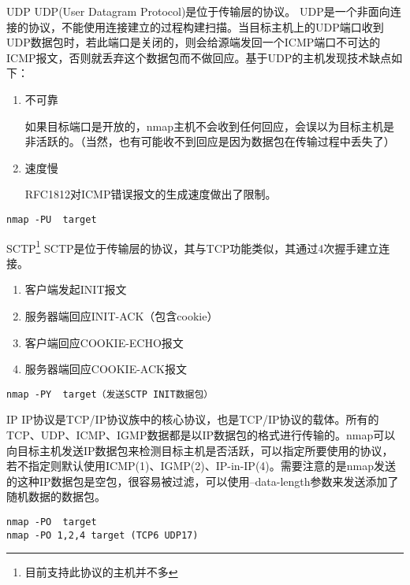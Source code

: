\documentclass{beamer}
\begin{document}
\begin{frame}[fragile]{UDP}
UDP(User Datagram Protocol)是位于传输层的协议。
UDP是一个非面向连接的协议，不能使用连接建立的过程构建扫描。当目标主机上的UDP端口收到UDP数据包时，若此端口是关闭的，则会给源端发回一个ICMP端口不可达的ICMP报文，否则就丢弃这个数据包而不做回应。基于UDP的主机发现技术缺点如下：
\begin{enumerate}
\item 不可靠

如果目标端口是开放的，nmap主机不会收到任何回应，会误以为目标主机是非活跃的。（当然，也有可能收不到回应是因为数据包在传输过程中丢失了）
\item 速度慢

RFC1812对ICMP错误报文的生成速度做出了限制。
\end{enumerate}
\begin{example}[命令语法]
\begin{verbatim}
nmap -PU  target
\end{verbatim}
\end{example}

\end{frame}

\begin{frame}[fragile]{SCTP\footnote{目前支持此协议的主机并不多}}
SCTP是位于传输层的协议，其与TCP功能类似，其通过4次握手建立连接。
\begin{enumerate}
\item 客户端发起INIT报文
\item 服务器端回应INIT-ACK（包含cookie）
\item 客户端回应COOKIE-ECHO报文
\item 服务器端回应COOKIE-ACK报文
\end{enumerate}
\begin{example}[命令语法]
\begin{verbatim}
nmap -PY  target（发送SCTP INIT数据包）
\end{verbatim}
\end{example}

\end{frame}

\begin{frame}[fragile]{IP}
IP协议是TCP/IP协议族中的核心协议，也是TCP/IP协议的载体。所有的TCP、UDP、ICMP、IGMP数据都是以IP数据包的格式进行传输的。nmap可以向目标主机发送IP数据包来检测目标主机是否活跃，可以指定所要使用的协议，若不指定则默认使用ICMP(1)、IGMP(2)、IP-in-IP(4)。需要注意的是nmap发送的这种IP数据包是空包，很容易被过滤，可以使用--data-length参数来发送添加了随机数据的数据包。
\begin{example}[命令语法]
\begin{verbatim}
nmap -PO  target
nmap -PO 1,2,4 target (TCP6 UDP17)
\end{verbatim}
\end{example}

\end{frame}
\end{document}

